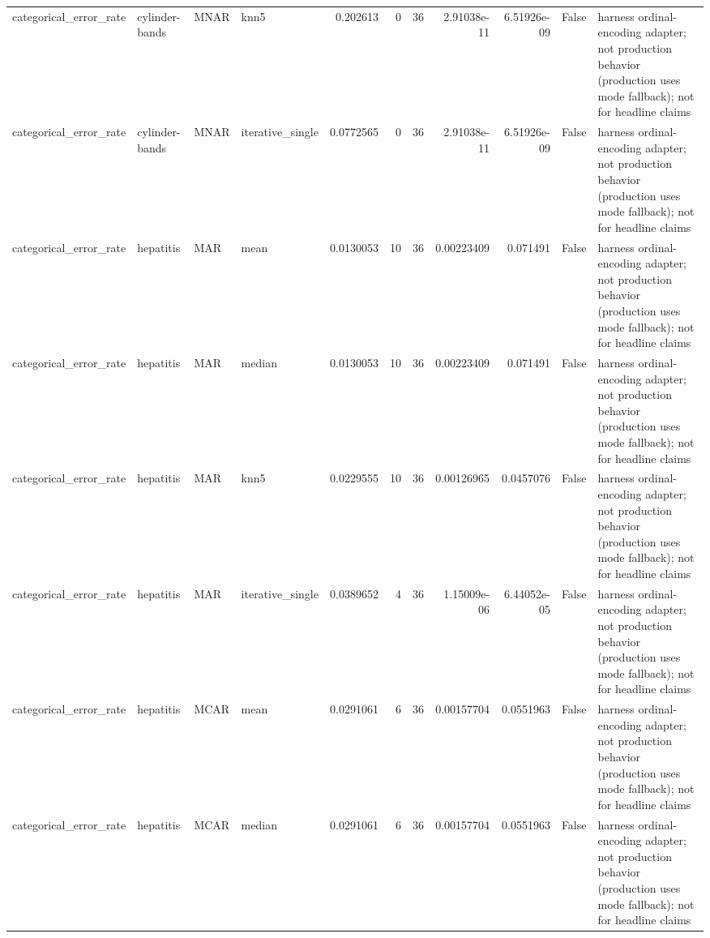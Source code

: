 \begin{table}[ht]
\begin{tabular}{llllrrrrrll}
 categorical\_error\_rate & cylinder-bands       & MNAR        & knn5             &      0.202613    &                   0 &      36 & 2.91038e-11 & 6.51926e-09 & False              & harness ordinal-encoding adapter; not production behavior (production uses mode fallback); not for headline claims \\
 categorical\_error\_rate & cylinder-bands       & MNAR        & iterative\_single &      0.0772565   &                   0 &      36 & 2.91038e-11 & 6.51926e-09 & False              & harness ordinal-encoding adapter; not production behavior (production uses mode fallback); not for headline claims \\
 categorical\_error\_rate & hepatitis            & MAR         & mean             &      0.0130053   &                  10 &      36 & 0.00223409  & 0.071491    & False              & harness ordinal-encoding adapter; not production behavior (production uses mode fallback); not for headline claims \\
 categorical\_error\_rate & hepatitis            & MAR         & median           &      0.0130053   &                  10 &      36 & 0.00223409  & 0.071491    & False              & harness ordinal-encoding adapter; not production behavior (production uses mode fallback); not for headline claims \\
 categorical\_error\_rate & hepatitis            & MAR         & knn5             &      0.0229555   &                  10 &      36 & 0.00126965  & 0.0457076   & False              & harness ordinal-encoding adapter; not production behavior (production uses mode fallback); not for headline claims \\
 categorical\_error\_rate & hepatitis            & MAR         & iterative\_single &      0.0389652   &                   4 &      36 & 1.15009e-06 & 6.44052e-05 & False              & harness ordinal-encoding adapter; not production behavior (production uses mode fallback); not for headline claims \\
 categorical\_error\_rate & hepatitis            & MCAR        & mean             &      0.0291061   &                   6 &      36 & 0.00157704  & 0.0551963   & False              & harness ordinal-encoding adapter; not production behavior (production uses mode fallback); not for headline claims \\
 categorical\_error\_rate & hepatitis            & MCAR        & median           &      0.0291061   &                   6 &      36 & 0.00157704  & 0.0551963   & False              & harness ordinal-encoding adapter; not production behavior (production uses mode fallback); not for headline claims \\

\end{tabular}
\end{table}
